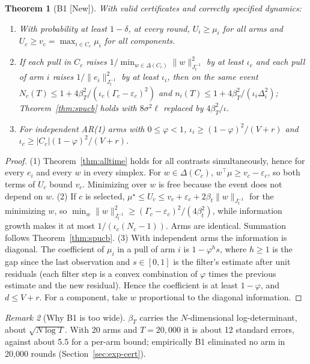 \documentclass[11pt]{article}
\newtheorem{theorem}{Theorem}
\theoremstyle{definition}
\theoremstyle{remark}
\newtheorem{remark}[theorem]{Remark}
\newcommand{\src}[1]{\textsf{[#1]}}
\begin{document}
\begin{theorem}[B1 \src{New}]\label{thm:b1}
With valid certificates and correctly specified dynamics:
\begin{enumerate}
\item With probability at least $1-\delta$, at every round, $U_i\ge\mu_i$ for all arms and $U_c\ge v_c=\max_{i\in C_c}\mu_i$ for all components.
\item If each pull in $C_c$ raises $1/\min_{w\in\Delta(C_c)}\|w\|^2_{J_t^{-1}}$ by at least $\iota_c$ and each pull of arm $i$ raises $1/\|e_i\|^2_{J_t^{-1}}$ by at least $\iota_i$, then on the same event $N_c(T)\le1+4\beta_T^2/(\iota_c(\Gamma_c-\varepsilon_c)^2)$ and $n_i(T)\le1+4\beta_T^2/(\iota_i\Delta_i^2)$; Theorem~\ref{thm:spucb} holds with $8\sigma^2\ell$ replaced by $4\beta_T^2/\iota$.
\item For independent AR(1) arms with $0\le\varphi<1$, $\iota_i\ge(1-\varphi)^2/(V+r)$ and $\iota_c\ge|C_c|(1-\varphi)^2/(V+r)$.
\end{enumerate}
\end{theorem}
\begin{proof}
(1) Theorem~\ref{thm:alltime} holds for all contrasts simultaneously, hence for every $e_i$ and every $w$ in every simplex. For $w\in\Delta(C_c)$, $w^\top\mu\ge v_c-\varepsilon_c$, so both terms of $U_c$ bound $v_c$. Minimizing over $w$ is free because the event does not depend on $w$.
(2) If $c$ is selected, $\mu^\star\le U_c\le v_c+\varepsilon_c+2\beta_t\|w\|_{J_t^{-1}}$ for the minimizing $w$, so $\min_w\|w\|^2_{J_t^{-1}}\ge(\Gamma_c-\varepsilon_c)^2/(4\beta_t^2)$, while information growth makes it at most $1/(\iota_c(N_c-1))$. Arms are identical. Summation follows Theorem~\ref{thm:spucb}.
(3) With independent arms the information is diagonal. The coefficient of $\mu_i$ in a pull of arm $i$ is $1-\varphi^h s$, where $h\ge1$ is the gap since the last observation and $s\in[0,1]$ is the filter's estimate after unit residuals (each filter step is a convex combination of $\varphi$ times the previous estimate and the new residual). Hence the coefficient is at least $1-\varphi$, and $d\le V+r$. For a component, take $w$ proportional to the diagonal information.
\end{proof}

\begin{remark}[Why B1 is too wide]
$\beta_T$ carries the $N$-dimensional log-determinant, about $\sqrt{N\log T}$. With 20 arms and $T=20{,}000$ it is about 12 standard errors, against about 5.5 for a per-arm bound; empirically B1 eliminated no arm in 20,000 rounds (Section~\ref{sec:exp-cert}).
\end{remark}
\end{document}
